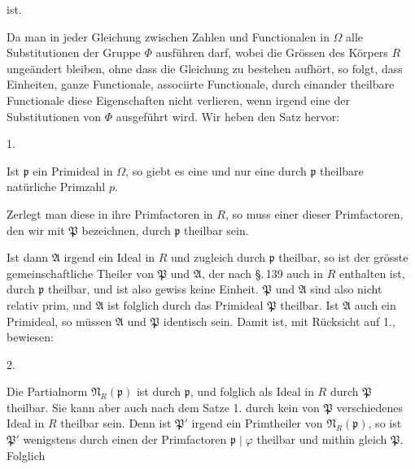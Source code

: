 ist. 

Da man in jeder Gleichung zwischen Zahlen und Functionalen in $\Omega$ alle
Substitutionen der Gruppe $\Phi$ ausführen darf, wobei die Grössen des Körpers $R$
ungeändert bleiben, ohne dass die Gleichung zu bestehen aufhört, so folgt, dass
Einheiten, ganze Functionale, associirte Functionale, durch einander theilbare
Functionale diese Eigenschaften nicht verlieren, wenn irgend eine der Substitutionen von
$\Phi$ ausgeführt wird. Wir heben den Satz hervor:

1.  %

Ist $\mathfrak{p}$ ein Primideal in $\Omega$, so giebt es eine und nur eine durch
$\mathfrak{p}$ theilbare natürliche Primzahl $p$.

Zerlegt man diese in ihre Primfactoren in $R$, so muss einer dieser Primfactoren, den
wir mit $\mathfrak{P}$ bezeichnen, durch $\mathfrak{p}$ theilbar sein.

Ist dann $\mathfrak{A}$ irgend ein Ideal in $R$ und zugleich durch $\mathfrak{p}$
theilbar, so ist der grösste gemeinschaftliche Theiler von $\mathfrak{P}$ und
$\mathfrak{A}$, der nach \S.\,139 auch in $R$ enthalten ist, durch $\mathfrak{p}$
theilbar, und ist also gewiss keine Einheit. $\mathfrak{P}$ und $\mathfrak{A}$ sind also
nicht relativ prim, und $\mathfrak{A}$ ist folglich durch das Primideal $\mathfrak{P}$
theilbar. Ist $\mathfrak{A}$ auch ein Primideal, so müssen $\mathfrak{A}$ und
$\mathfrak{P}$ identisch sein. Damit ist, mit Rücksicht auf 1., bewiesen:

2. 

Die Partialnorm $\mathfrak{N}_R(\mathfrak{p})$ ist durch $\mathfrak{p}$, und folglich als
Ideal in $R$ durch $\mathfrak{P}$ theilbar. Sie kann aber auch nach dem Satze 1. durch
kein von $\mathfrak{P}$ verschiedenes Ideal in $R$ theilbar sein. Denn ist $\mathfrak{P}'$
irgend ein Primtheiler von $\mathfrak{N}_R(\mathfrak{p})$, so ist $\mathfrak{P}'$
wenigstens durch einen der Primfactoren $\mathfrak{p} \mid \varphi$ theilbar und mithin
gleich $\mathfrak{P}$. Folglich
